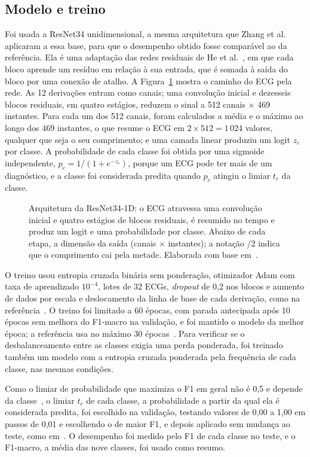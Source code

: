 \subsection{Modelo e treino}\label{sec:modelo}
Foi usada a ResNet34 unidimensional, a mesma arquitetura que Zhang et al.~\cite{zhang2021} aplicaram a essa base, para que o desempenho obtido fosse comparável ao da referência. Ela é uma adaptação das redes residuais de He et al.~\cite{he2016}, em que cada bloco aprende um resíduo em relação à sua entrada, que é somada à saída do bloco por uma conexão de atalho. A Figura~\ref{fig:resnet} mostra o caminho do ECG pela rede. As 12 derivações entram como canais; uma convolução inicial e dezesseis blocos residuais, em quatro estágios, reduzem o sinal a 512 canais × 469 instantes. Para cada um dos 512 canais, foram calculados a média e o máximo ao longo dos 469 instantes, o que resume o ECG em $2 \times 512 = 1\,024$ valores, qualquer que seja o seu comprimento; e uma camada linear produziu um logit $z_c$ por classe. A probabilidade de cada classe foi obtida por uma sigmoide independente, $p_c = 1/(1+e^{-z_c})$, porque um ECG pode ter mais de um diagnóstico, e a classe foi considerada predita quando $p_c$ atingiu o limiar $t_c$ da classe.

\begin{figure}[!t]\centering

\caption{Arquitetura da ResNet34-1D: o ECG atravessa uma convolução inicial e quatro estágios de blocos residuais, é resumido no tempo e produz um logit e uma probabilidade por classe. Abaixo de cada etapa, a dimensão da saída (canais × instantes); a notação /2 indica que o comprimento cai pela metade. Elaborada com base em~\cite{zhang2021}.}\label{fig:resnet}
\end{figure}

O treino usou entropia cruzada binária sem ponderação, otimizador Adam com taxa de aprendizado $10^{-4}$, lotes de 32 ECGs, \textit{dropout} de 0,2 nos blocos e aumento de dados por escala e deslocamento da linha de base de cada derivação, como na referência~\cite{zhang2021}. O treino foi limitado a 60 épocas, com parada antecipada após 10 épocas sem melhora do F1-macro na validação, e foi mantido o modelo da melhor época; a referência usa no máximo 30 épocas~\cite{zhang2021}. Para verificar se o desbalanceamento entre as classes exigia uma perda ponderada, foi treinado também um modelo com a entropia cruzada ponderada pela frequência de cada classe, nas mesmas condições.

Como o limiar de probabilidade que maximiza o F1 em geral não é 0,5 e depende da classe~\cite{lipton2014}, o limiar $t_c$ de cada classe, a probabilidade a partir da qual ela é considerada predita, foi escolhido na validação, testando valores de 0,00 a 1,00 em passos de 0,01 e escolhendo o de maior F1, e depois aplicado sem mudança ao teste, como em~\cite{zhang2021}. O desempenho foi medido pelo F1 de cada classe no teste, e o F1-macro, a média das nove classes, foi usado como resumo.

